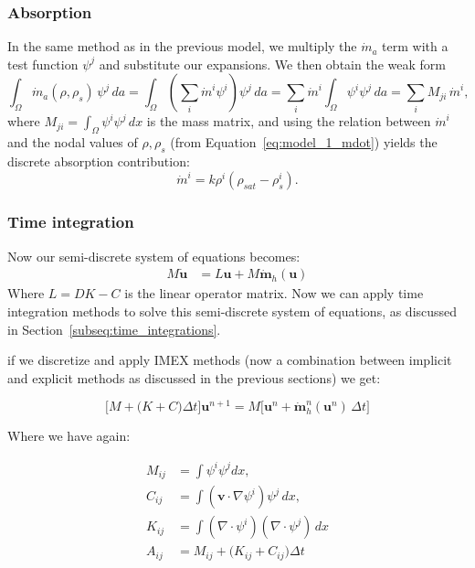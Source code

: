 \subsubsection*{Absorption}
In the same method as in the previous model, we multiply the $\dot{m}_a$ term with a test function $\psi^j$ and substitute our expansions. We then obtain the weak form
\begin{equation*}
    \int_\Omega \dot{m}_a(\rho,\rho_s)\,\psi^j\,da
    = \int_\Omega \left(\sum_i \dot m^i\psi^i\right)\psi^j\,da
    = \sum_i \dot m^i \int_\Omega \psi^i\psi^j\,da
    = \sum_i M_{ji}\,\dot m^i,
\end{equation*}
where $M_{ji}=\int_\Omega\psi^i\psi^j\,dx$ is the mass matrix, and using the relation between $\dot m^i$ and the nodal values of $\rho,\rho_s$ (from Equation~\ref{eq:model_1_mdot}) yields the discrete absorption contribution:
\begin{equation*}
    \dot{m}^i = k\rho^i(\rho_{sat}-\rho_s^i).
\end{equation*}


\subsubsection*{Time integration}
Now our semi-discrete system of equations becomes:
\begin{equation*}
\begin{aligned}
    M \dot{\mathbf{u}} &= L\mathbf{u}+M\mathbf{\dot m}_h(\mathbf{u})
\end{aligned}
\end{equation*}
Where $L=D K-C$ is the linear operator matrix. Now we can apply time integration methods to solve this semi-discrete system of equations, as discussed in Section~\ref{subseq:time_integrations}.


if we discretize and apply IMEX methods (now a combination between implicit and explicit methods as discussed in the previous sections) we get:

\begin{equation*}
\big[M+\big( K+C\big) \Delta t \big]\mathbf{u}^{n+1}=M\big[ \mathbf u^n + \mathbf{\dot m}_h^n(\mathbf{u}^n)\, \Delta t\big]
\end{equation*}

Where we have again:

\begin{align*}
M_{ij}&=\int \psi^i\psi^j dx,\\
C_{ij}&=\int (\mathbf{v}\cdot\nabla\psi^i)\psi^j \,dx,\\
K_{ij}&=\int (\nabla \cdot \psi^i)(\nabla \cdot \psi^j)\, dx \\
A_{ij}&=M_{ij}+\big( K_{ij}+C_{ij}\big) \Delta t
\end{align*}